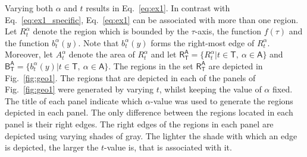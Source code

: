 \documentclass{article}
\theoremstyle{theorem}
\theoremstyle{definition}
\begin{document}
\noindent
Varying both $\alpha$ and $t$ results in Eq.~\eqref{eq:ex1}. In contrast with Eq.~\eqref{eq:ex1_specific}, Eq.~\eqref{eq:ex1} can be associated with more than one region. 
Let $R_{t}^{\alpha}$ denote the region which is bounded by the $\tau$-axis, the function $f(\tau)$ and the function $b_{t}^{\alpha}(y)$. Note that $b_{t}^{\alpha}(y)$ forms the 
right-most edge of $R_{t}^{\alpha}$. Moreover, let $A_{t}^{\alpha}$ denote the area of $R_{t}^{\alpha}$ and let $\mathsf{R}_{\mathsf{T}}^{\mathsf{A}}=\{R_t^{\alpha}|t\in\mathsf{T},~\alpha\in\mathsf{A}\}$ and 
$\mathsf{B}_{\mathsf{T}}^{\mathsf{A}}=\{b_t^{\alpha}(y)|t\in\mathsf{T},~\alpha\in\mathsf{A}\}$. 
The regions in the set $\mathsf{R}_{\mathsf{T}}^{\mathsf{A}}$ are depicted in Fig.~\ref{fig:geo1}. The regions that are depicted in each of the panels of Fig.~\ref{fig:geo1} were generated by varying $t$, whilst keeping the value of $\alpha$ fixed. 
The title of each panel indicate which $\alpha$-value was used to generate the regions depicted in each panel. The only difference between the regions located in each 
panel is their right edges. The right edges of the regions in each panel are depicted using varying shades of gray. The lighter the shade with which an edge is depicted, 
the larger the $t$-value is, that is associated with it.\\
\end{document}
